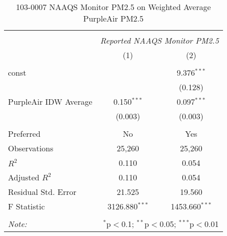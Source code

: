 \begin{table}[!htbp] \centering
  \caption{103-0007 NAAQS Monitor PM2.5 on Weighted Average PurpleAir PM2.5}
  \label{tab:reg_103-0007}
\begin{tabular}{@{\extracolsep{5pt}}lcc}
\\[-1.8ex]\hline
\hline \\[-1.8ex]
& \multicolumn{2}{c}{\textit{Reported NAAQS Monitor PM2.5}} \
\cr \cline{2-3}
\\[-1.8ex] & (1) & (2) \\
\hline \\[-1.8ex]
 const & & 9.376$^{***}$ \\
  & & (0.128) \\
 PurpleAir IDW Average & 0.150$^{***}$ & 0.097$^{***}$ \\
  & (0.003) & (0.003) \\
\hline \\[-1.8ex]
 Preferred & No & Yes \\
 Observations & 25,260 & 25,260 \\
 $R^2$ & 0.110 & 0.054 \\
 Adjusted $R^2$ & 0.110 & 0.054 \\
 Residual Std. Error & 21.525 & 19.560  \\
 F Statistic & 3126.880$^{***}$  & 1453.660$^{***}$  \\
\hline
\hline \\[-1.8ex]
\textit{Note:} & \multicolumn{2}{r}{$^{*}$p$<$0.1; $^{**}$p$<$0.05; $^{***}$p$<$0.01} \\
\end{tabular}
\end{table}
